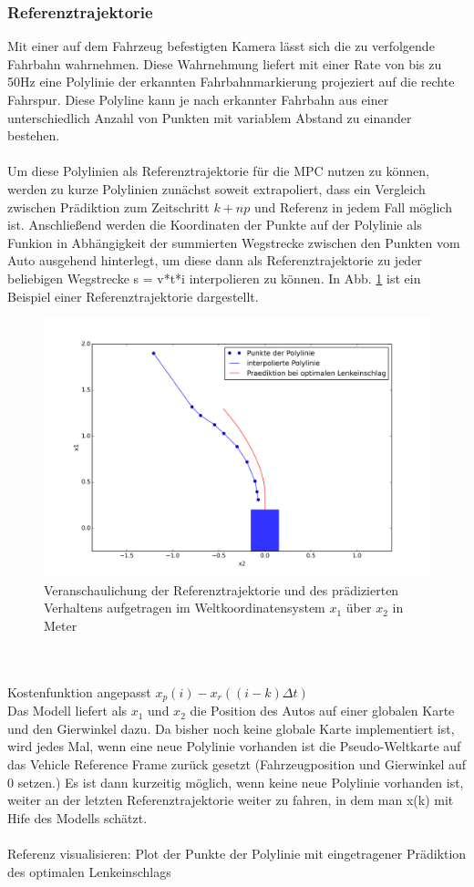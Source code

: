 \subsubsection{Referenztrajektorie}
Mit einer auf dem Fahrzeug befestigten Kamera lässt sich die zu verfolgende Fahrbahn wahrnehmen. Diese Wahrnehmung liefert mit einer Rate von bis zu 50Hz eine Polylinie der erkannten Fahrbahnmarkierung projeziert auf die rechte Fahrspur. Diese Polyline kann je nach erkannter Fahrbahn aus einer unterschiedlich Anzahl von Punkten mit variablem Abstand zu einander bestehen.\\ \\
Um diese Polylinien als Referenztrajektorie für die MPC nutzen zu können, werden zu kurze Polylinien zunächst soweit extrapoliert, dass ein Vergleich zwischen Prädiktion zum Zeitschritt $k+np$ und Referenz in jedem Fall möglich ist. Anschließend werden die Koordinaten der Punkte auf der Polylinie als Funkion in Abhängigkeit der summierten Wegstrecke zwischen den Punkten vom Auto ausgehend hinterlegt, um diese dann als Referenztrajektorie zu jeder beliebigen Wegstrecke s = v*t*i interpolieren zu können. In Abb. \ref{fig:referenz} ist ein Beispiel einer Referenztrajektorie dargestellt.
\begin{figure}[t]
\centering
\includegraphics[scale=0.53]{Bilder/Reference.png}
\caption{Veranschaulichung der Referenztrajektorie und des prädizierten Verhaltens aufgetragen im Weltkoordinatensystem $x_1$ über $x_2$ in Meter}
\label{fig:referenz}
\end{figure}\\ \\
Kostenfunktion angepasst $x_p(i)-x_r((i-k)\Delta t)$\\
Das Modell liefert als $x_1$ und $x_2$ die Position des Autos auf einer globalen Karte und den Gierwinkel dazu. Da bisher noch keine globale Karte implementiert ist, wird jedes Mal, wenn eine neue Polylinie vorhanden ist die Pseudo-Weltkarte auf das Vehicle Reference Frame zurück gesetzt (Fahrzeugposition und Gierwinkel auf 0 setzen.) Es ist dann kurzeitig möglich, wenn keine neue Polylinie vorhanden ist, weiter an der letzten Referenztrajektorie weiter zu fahren, in dem man x(k) mit Hife des Modells schätzt.\\ \\
Referenz visualisieren: Plot der Punkte der Polylinie mit eingetragener Prädiktion des optimalen Lenkeinschlags
